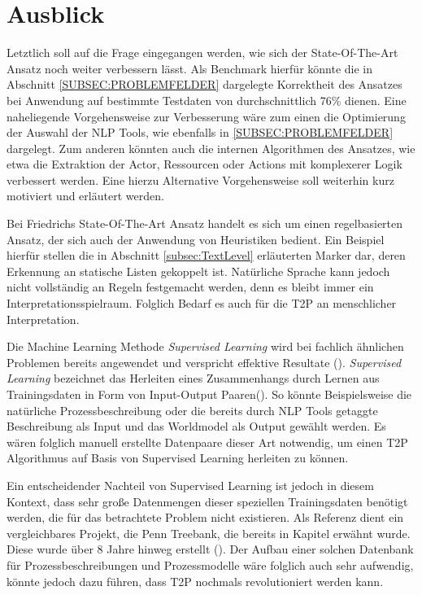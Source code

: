 \section{Ausblick}
Letztlich soll auf die Frage eingegangen werden, wie sich der State-Of-The-Art Ansatz noch weiter verbessern lässt. Als Benchmark hierfür könnte die in Abschnitt \ref{SUBSEC:PROBLEMFELDER} dargelegte Korrektheit des Ansatzes bei Anwendung auf bestimmte Testdaten von durchschnittlich 76\% dienen. Eine naheliegende Vorgehensweise zur Verbesserung wäre zum einen die Optimierung der Auswahl der \ac{NLP} Tools, wie ebenfalls in \ref{SUBSEC:PROBLEMFELDER} dargelegt. Zum anderen könnten auch die internen Algorithmen des Ansatzes, wie etwa die Extraktion der Actor, Ressourcen oder Actions mit komplexerer Logik verbessert werden. Eine hierzu Alternative Vorgehensweise soll weiterhin kurz motiviert und erläutert werden.\par  
Bei Friedrichs State-Of-The-Art Ansatz handelt es sich um einen regelbasierten Ansatz, der sich auch der Anwendung von Heuristiken bedient. Ein Beispiel hierfür stellen die in Abschnitt \ref{subsec:TextLevel} erläuterten Marker dar, deren Erkennung an statische Listen gekoppelt ist. Natürliche Sprache kann jedoch nicht vollständig an Regeln festgemacht werden, denn es bleibt immer ein Interpretationsspielraum. Folglich Bedarf es auch für die \ac{T2P} an menschlicher Interpretation. \par
Die Machine Learning Methode \textit{Supervised Learning} wird bei fachlich ähnlichen Problemen bereits angewendet und verspricht effektive Resultate (\cite[vgl.][2]{BPMML}). \textit{Supervised Learning} bezeichnet das Herleiten eines Zusammenhangs durch Lernen aus Trainingsdaten in Form von Input-Output Paaren(\cite[vgl.][695]{AIMODERN}). So könnte Beispielsweise die natürliche Prozessbeschreibung oder die bereits durch \ac{NLP} Tools getaggte Beschreibung als Input und das Worldmodel als Output gewählt werden. Es wären folglich manuell erstellte Datenpaare dieser Art notwendig, um einen \ac{T2P} Algorithmus auf Basis von Supervised Learning herleiten zu können.\par
Ein entscheidender Nachteil von Supervised Learning ist jedoch in diesem Kontext, dass sehr große Datenmengen dieser speziellen Trainingsdaten benötigt werden, die für das betrachtete Problem nicht existieren. Als Referenz dient ein vergleichbares Projekt, die Penn Treebank, die bereits in Kapitel \label{subsec:pos} erwähnt wurde. Diese wurde über 8 Jahre hinweg erstellt (\cite[vgl.][1]{PENNTREEBANK}). Der Aufbau einer solchen Datenbank für Prozessbeschreibungen und Prozessmodelle wäre folglich auch sehr aufwendig, könnte jedoch dazu führen, dass \ac{T2P} nochmals revolutioniert werden kann.